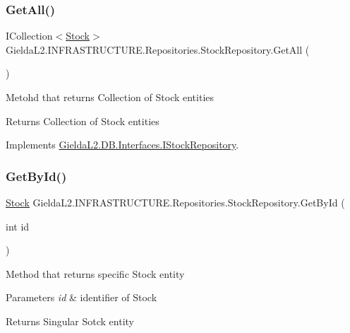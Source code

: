 \subsubsection{\texorpdfstring{GetAll()}{GetAll()}}
{\footnotesize\ttfamily I\+Collection$<$\mbox{\hyperlink{class_gielda_l2_1_1_d_b_1_1_entities_1_1_stock}{Stock}}$>$ Gielda\+L2.\+I\+N\+F\+R\+A\+S\+T\+R\+U\+C\+T\+U\+R\+E.\+Repositories.\+Stock\+Repository.\+Get\+All (\begin{DoxyParamCaption}{ }\end{DoxyParamCaption})}



Metohd that returns Collection of Stock entities 

\begin{DoxyReturn}{Returns}
Collection of Stock entities
\end{DoxyReturn}


Implements \mbox{\hyperlink{interface_gielda_l2_1_1_d_b_1_1_interfaces_1_1_i_stock_repository_a038d11f6dd79d0b6361e16137a16f1f7}{Gielda\+L2.\+D\+B.\+Interfaces.\+I\+Stock\+Repository}}.

\mbox{\label{class_gielda_l2_1_1_i_n_f_r_a_s_t_r_u_c_t_u_r_e_1_1_repositories_1_1_stock_repository_ab4ff737a226f62c0abbe80751029bbdf}} 
\subsubsection{\texorpdfstring{GetById()}{GetById()}}
{\footnotesize\ttfamily \mbox{\hyperlink{class_gielda_l2_1_1_d_b_1_1_entities_1_1_stock}{Stock}} Gielda\+L2.\+I\+N\+F\+R\+A\+S\+T\+R\+U\+C\+T\+U\+R\+E.\+Repositories.\+Stock\+Repository.\+Get\+By\+Id (\begin{DoxyParamCaption}\item[{int}]{id }\end{DoxyParamCaption})}



Method that returns specific Stock entity 


\begin{DoxyParams}{Parameters}
{\em id} & identifier of Stock\\
\hline
\end{DoxyParams}
\begin{DoxyReturn}{Returns}
Singular Sotck entity
\end{DoxyReturn}


